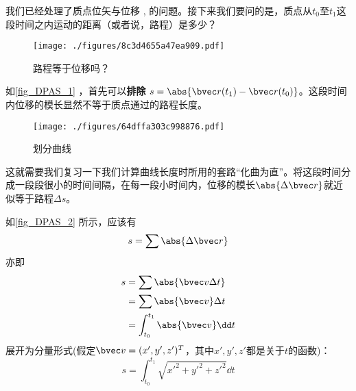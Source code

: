 

我们已经处理了质点位矢与位移 , 的问题。接下来我们要问的是，质点从$t_0$至$t_1$这段时间之内运动的距离（或者说，路程）是多少？

\begin{figure}[ht]
\centering
\texttt{[image: ./figures/8c3d4655a47ea909.pdf]}
\caption{路程等于位移吗？} \label{fig_DPAS_1}
\end{figure}

如\autoref{fig_DPAS_1} ，首先可以\textbf{排除} $s = \abs{\bvec r(t_1) - \bvec r(t_0)}  $。这段时间内位移的模长显然不等于质点通过的路程长度。

\begin{figure}[ht]
\centering
\texttt{[image: ./figures/64dffa303c998876.pdf]}
\caption{划分曲线} \label{fig_DPAS_2}
\end{figure}

这就需要我们复习一下我们计算曲线长度时所用的套路“化曲为直”。将这段时间分成一段段很小的时间间隔，在每一段小时间内，位移的模长$\abs{\Delta \bvec r}$就近似等于路程$\Delta s$。

如\autoref{fig_DPAS_2} 所示，应该有 $$s=\sum \abs{\Delta \bvec r}$$
亦即$$
\begin{aligned}
s&=\sum \abs{\bvec v \Delta t}\\
&=\sum \abs{\bvec v} \Delta t\\
&=\int _{t_0}^{t_1} \abs{\bvec v} \dd t\\
\end{aligned}
$$
展开为分量形式(假定$\bvec v = (x',y',z')^T$，其中$x',y',z'$都是关于$t$的函数)：
$$
s = \int _{t_0}^{t_1} \sqrt{x'^2+y'^2+z'^2} \dd t
$$
